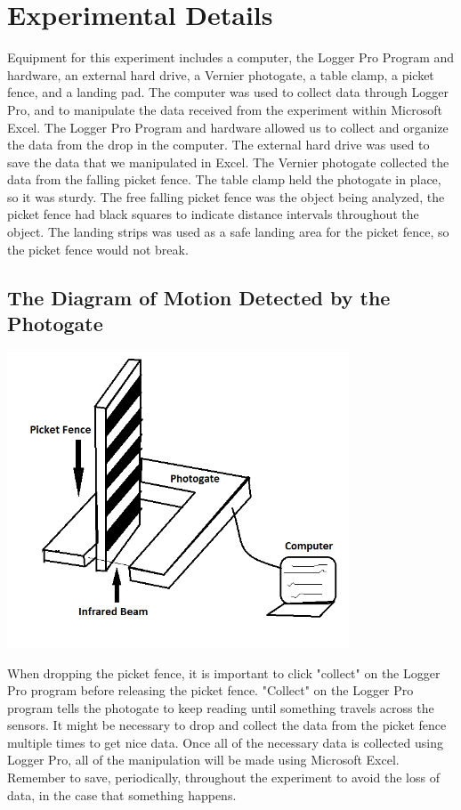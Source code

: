 \documentclass[aps,letterpaper,11pt]{revtex4}
\begin{document}
\newpage

\section{Experimental Details}

Equipment for this experiment includes a computer, the Logger Pro Program and hardware, an external hard drive, a Vernier photogate, a table clamp, a picket fence, and a landing pad. The computer was used to collect data through Logger Pro, and to manipulate the data received from the experiment within Microsoft Excel. The Logger Pro Program and hardware allowed us to collect and organize the data from the drop in the computer. The external hard drive was used to save the data that we manipulated in Excel.  The Vernier photogate collected the data from the falling picket fence. The table clamp held the photogate in place, so it was sturdy. The free falling picket fence was the object being analyzed, the picket fence had black squares to indicate distance intervals throughout the object. The landing strips was used as a safe landing area for the picket fence, so the picket fence would not break. 

\subsection{The Diagram of Motion Detected by the Photogate}

\begin{center}
\includegraphics[width=4in]{Setup.png}
\end{center}

When dropping the picket fence, it is important to click "collect" on the Logger Pro program before releasing the picket fence. "Collect" on the Logger Pro program tells the photogate to keep reading until something travels across the sensors. It might be necessary to drop and collect the data from the picket fence multiple times to get nice data. Once all of the necessary data is collected using Logger Pro, all of the manipulation will be made using  Microsoft Excel. Remember to save, periodically, throughout the experiment to avoid the loss of data, in the case that something happens. 
\end{document}
